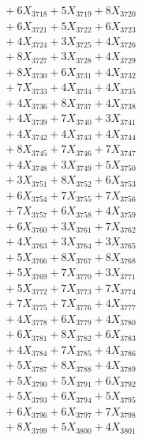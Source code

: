 \documentclass[a4paper,10pt]{article}
\begin{document}
{\begin{align}
&\;  + 6 X_{3718} + 5 X_{3719} + 8 X_{3720} \\[0.3ex]
&\;  + 6 X_{3721} + 5 X_{3722} + 6 X_{3723} \\[0.3ex]
&\;  + 4 X_{3724} + 3 X_{3725} + 4 X_{3726} \\[0.3ex]
&\;  + 8 X_{3727} + 3 X_{3728} + 4 X_{3729} \\[0.5ex]\allowbreak
&\;  + 8 X_{3730} + 6 X_{3731} + 4 X_{3732} \\[0.3ex]
&\;  + 7 X_{3733} + 4 X_{3734} + 4 X_{3735} \\[0.3ex]
&\;  + 4 X_{3736} + 8 X_{3737} + 4 X_{3738} \\[0.3ex]
&\;  + 4 X_{3739} + 7 X_{3740} + 3 X_{3741} \\[0.3ex]
&\;  + 4 X_{3742} + 4 X_{3743} + 4 X_{3744} \\[0.3ex]
&\;  + 8 X_{3745} + 7 X_{3746} + 7 X_{3747} \\[0.3ex]
&\;  + 4 X_{3748} + 3 X_{3749} + 5 X_{3750} \\[0.3ex]
&\;  + 3 X_{3751} + 8 X_{3752} + 6 X_{3753} \\[0.3ex]
&\;  + 6 X_{3754} + 7 X_{3755} + 7 X_{3756} \\[0.3ex]
&\;  + 7 X_{3757} + 6 X_{3758} + 4 X_{3759} \\[0.5ex]\allowbreak
&\;  + 6 X_{3760} + 3 X_{3761} + 7 X_{3762} \\[0.3ex]
&\;  + 4 X_{3763} + 3 X_{3764} + 3 X_{3765} \\[0.3ex]
&\;  + 5 X_{3766} + 8 X_{3767} + 8 X_{3768} \\[0.3ex]
&\;  + 5 X_{3769} + 7 X_{3770} + 3 X_{3771} \\[0.3ex]
&\;  + 5 X_{3772} + 7 X_{3773} + 7 X_{3774} \\[0.3ex]
&\;  + 7 X_{3775} + 7 X_{3776} + 4 X_{3777} \\[0.3ex]
&\;  + 4 X_{3778} + 6 X_{3779} + 4 X_{3780} \\[0.3ex]
&\;  + 6 X_{3781} + 8 X_{3782} + 6 X_{3783} \\[0.3ex]
&\;  + 4 X_{3784} + 7 X_{3785} + 4 X_{3786} \\[0.3ex]
&\;  + 5 X_{3787} + 8 X_{3788} + 4 X_{3789} \\[0.5ex]\allowbreak
&\;  + 5 X_{3790} + 5 X_{3791} + 6 X_{3792} \\[0.3ex]
&\;  + 5 X_{3793} + 6 X_{3794} + 5 X_{3795} \\[0.3ex]
&\;  + 6 X_{3796} + 6 X_{3797} + 7 X_{3798} \\[0.3ex]
&\;  + 8 X_{3799} + 5 X_{3800} + 4 X_{3801} \\[0.3ex]

\end{align}}
\end{document}
